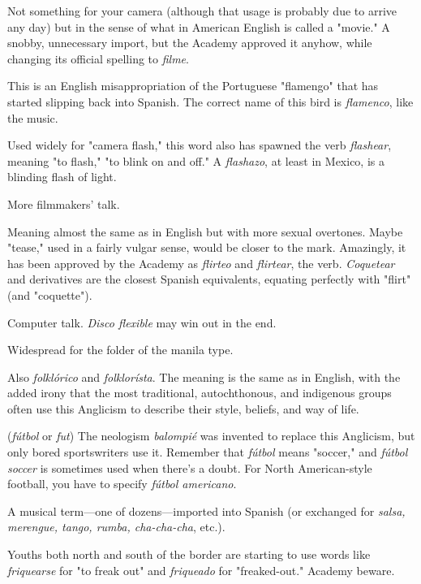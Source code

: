  Not something for your camera (although that usage is
probably due to arrive any day) but in the sense of what in American
English is called a "movie." A snobby, unnecessary import, but the
Academy approved it anyhow, while changing its official spelling to
\emph{filme}.

 This is an English misappropriation of the Portuguese "flamengo" that has started slipping back into Spanish. The correct name of this bird is \emph{flamenco}, like the music.

 Used widely for "camera flash," this word also has
spawned the verb \emph{flashear}, meaning "to flash," "to blink on and off."
A \emph{flashazo}, at least in Mexico, is a blinding flash of light.

 More filmmakers' talk.

 Meaning almost the same as in English but with more
sexual overtones. Maybe "tease," used in a fairly vulgar sense, would be
closer to the mark. Amazingly, it has been approved by the Academy as
\emph{flirteo} and \emph{flirtear}, the verb. \emph{Coquetear} and derivatives are the closest
Spanish equivalents, equating perfectly with "flirt" (and "coquette").

 Computer talk. \emph{Disco flexible} may win out in the end.

 Widespread for the folder of the manila type.

 Also \emph{folklórico} and \emph{folklorísta}. The meaning is
the same as in English, with the added irony that the most traditional,
autochthonous, and indigenous groups often use this Anglicism to describe their style, beliefs, and way of life.

 (\emph{fútbol} or \emph{fut}) The neologism \emph{balompié} was invented to replace this Anglicism, but only bored sportswriters use it.
Remember that \emph{fútbol} means "soccer," and \emph{fútbol soccer} is sometimes
used when there's a doubt. For North American-style football, you
have to specify \emph{fútbol americano}.

 A musical term---one of dozens---imported into
Spanish (or exchanged for \emph{salsa, merengue, tango, rumba, cha-cha-cha}, etc.).

 Youths both north and south of the border are starting to use words like \emph{friquearse} for "to freak out" and \emph{friqueado} for
"freaked-out." Academy beware.

